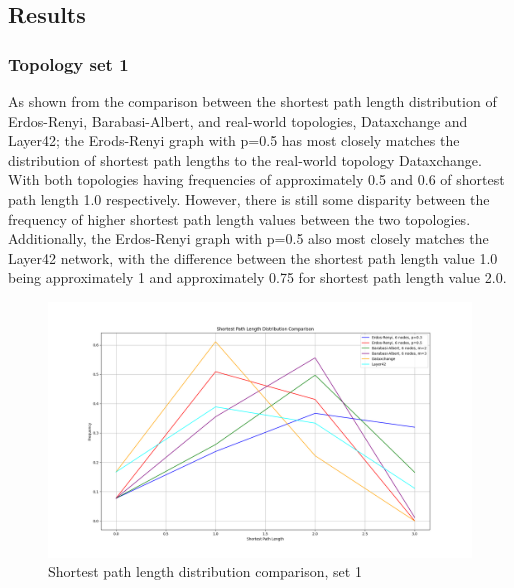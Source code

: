 

\subsection{Results}


\subsubsection{Topology set 1}
As shown from the comparison between the shortest path length distribution of Erdos-Renyi, Barabasi-Albert, and real-world topologies, Dataxchange and Layer42; the Erods-Renyi graph with p=0.5 has most closely matches the distribution of shortest path lengths to the real-world topology Dataxchange. With both topologies having frequencies of approximately 0.5 and 0.6 of shortest path length 1.0 respectively. However, there is still some disparity between the frequency of higher shortest path length values between the two topologies. Additionally, the Erdos-Renyi graph with p=0.5 also most closely matches the Layer42 network, with the difference between the shortest path length value 1.0 being approximately 1 and approximately 0.75 for shortest path length value 2.0.  

\begin{figure}
    \centering
    \includegraphics[width=0.9\linewidth]{images/FINAL-TOPO-COMP/line-6.png}
    \caption{Shortest path length distribution comparison, set 1}
    \label{fig:enter-label}
\end{figure}

